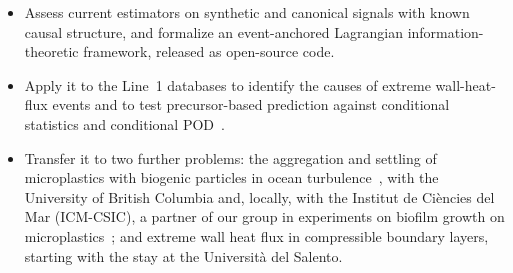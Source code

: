 \documentclass[11pt]{article}
\begin{document}
\begin{itemize}
  \item[\textbf{O4.}] Assess current estimators on synthetic and canonical signals with known
  causal structure, and formalize an event-anchored Lagrangian information-theoretic
  framework, released as open-source code.
  \item[\textbf{O5.}] Apply it to the Line~1 databases to identify the causes of extreme
  wall-heat-flux events and to test precursor-based prediction against conditional
  statistics and conditional POD~\cite{Martin2025}.
  \item[\textbf{O6.}] Transfer it to two further problems: the aggregation and settling of
  microplastics with biogenic particles in ocean
  turbulence~\cite{Rahmani2022,Pizzi2024,Pizzi2026}, with the University of British Columbia
  and, locally, with the Institut de Ci\`encies del Mar (ICM-CSIC), a partner of our group in
  experiments on biofilm growth on microplastics~\cite{Pizzi2025}; and extreme wall heat flux
  in compressible boundary layers, starting with the stay at the Universit\`a del Salento.
\end{itemize}
\end{document}
